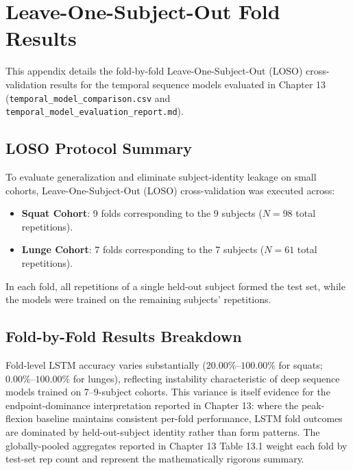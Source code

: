 \chapter{Leave-One-Subject-Out Fold Results}
\label{app:loso}



This appendix details the fold-by-fold Leave-One-Subject-Out (LOSO) cross-validation results for the temporal sequence models evaluated in Chapter 13 (\texttt{temporal\_model\_comparison.csv} and \texttt{temporal\_model\_evaluation\_report.md}).



\section{LOSO Protocol Summary}
\label{sec:b-1-loso-protocol-summary}


To evaluate generalization and eliminate subject-identity leakage on small cohorts, Leave-One-Subject-Out (LOSO) cross-validation was executed across:
\begin{itemize}
  \item \textbf{Squat Cohort}: 9 folds corresponding to the 9 subjects ($N=98$ total repetitions).
  \item \textbf{Lunge Cohort}: 7 folds corresponding to the 7 subjects ($N=61$ total repetitions).
\end{itemize}

In each fold, all repetitions of a single held-out subject formed the test set, while the models were trained on the remaining subjects' repetitions.



\section{Fold-by-Fold Results Breakdown}
\label{sec:b-2-fold-by-fold-results-breakdown}


Fold-level LSTM accuracy varies substantially ($20.00\%\text{--}100.00\%$ for squats; $0.00\%\text{--}100.00\%$ for lunges), reflecting instability characteristic of deep sequence models trained on 7–9-subject cohorts. This variance is itself evidence for the endpoint-dominance interpretation reported in Chapter 13: where the peak-flexion baseline maintains consistent per-fold performance, LSTM fold outcomes are dominated by held-out-subject identity rather than form patterns. The globally-pooled aggregates reported in Chapter 13 Table 13.1 weight each fold by test-set rep count and represent the mathematically rigorous summary.

